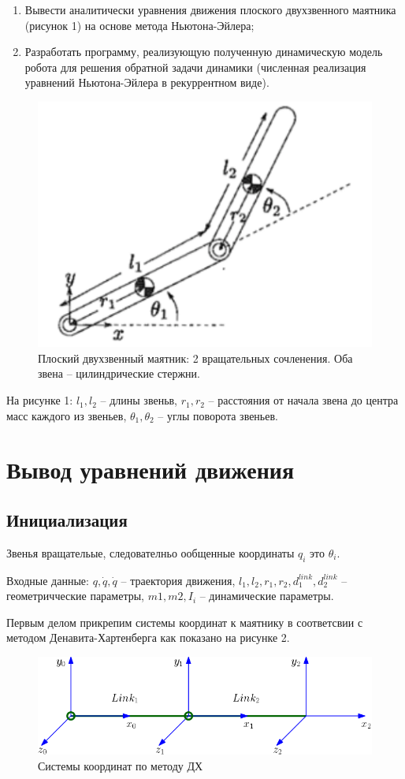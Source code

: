 \documentclass[a4paper,14pt]{extreport}
\begin{document}
\begin{enumerate}
	\item Вывести аналитически уравнения движения плоского двухзвенного маятника (рисунок 1) на основе метода Ньютона-Эйлера;
	\item Разработать программу, реализующую полученную динамическую
	модель робота для решения обратной задачи динамики (численная реализация уравнений Ньютона-Эйлера в рекуррентном виде).
\end{enumerate}

\begin{figure}[H]
	\center\includegraphics[width=0.5\linewidth]{images/1.png}
	\caption{Плоский двухзвенный маятник: 2 вращательных сочленения. Оба звена -- цилиндрические стержни.}
	\label{fig:scr1}
\end{figure}
На рисунке 1: $l_1, l_2$ -- длины звеньв, $r_1, r_2$ -- расстояния от начала звена до центра масс каждого из звеньев, $\theta_1, \theta_2$ -- углы поворота звеньев.

\section{Вывод уравнений движения}

\subsection{Инициализация}

Звенья вращательые, следователньо ообщенные координаты $q_i$ это $\theta_i$.

Входные данные: $q, \dot q, \dot q$ -- траектория движения, $l_1, l_2, r_1, r_2, d^{link}_1,  d^{link}_2$ -- геометричческие параметры, $m1, m2, I_i$ -- динамические параметры.

Первым делом прикрепим системы координат к маятнику в соответсвии с методом Денавита-Хартенберга как показано на рисунке 2.

\begin{figure}[H]
	\center\includegraphics[width=0.8\linewidth]{images/2.png}
	\caption{Системы координат по методу ДХ}
	\label{fig:scr1}
\end{figure}
\end{document}
